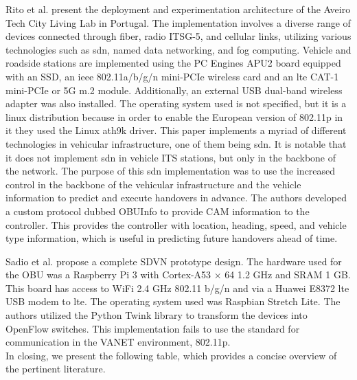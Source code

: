     
    Rito et al.\cite{rito_aveiro_2023} present the deployment and experimentation architecture of the Aveiro Tech City Living Lab in Portugal. The implementation involves a diverse range of devices connected through fiber, radio ITSG-5, and cellular links, utilizing various technologies such as \gls{sdn}, named data networking, and fog computing.
    Vehicle and roadside stations are implemented using the PC Engines APU2 board equipped with an SSD, an \gls{ieee} 802.11a/b/g/n mini-PCIe wireless card and an \gls{lte} CAT-1 mini-PCIe or 5G m.2 module. Additionally, an external USB dual-band wireless adapter was also installed. The operating system used is not specified, but it is a linux distribution because in order to enable the European version of 802.11p in it they used the Linux ath9k driver.
    This paper implements a myriad of different technologies in vehicular infrastructure, one of them being \gls{sdn}. It is notable that it does not implement \gls{sdn} in vehicle ITS stations, but only in the backbone of the network. The purpose of this \gls{sdn} implementation was to use the increased control in the backbone of the vehicular infrastructure and the vehicle information to predict and execute handovers in advance. The authors developed a custom protocol dubbed OBUInfo to provide CAM information to the controller. This provides the controller with location, heading, speed, and vehicle type information, which is useful in predicting future handovers ahead of time.
    
    
    Sadio et al.\cite{sadio_design_2020} propose a complete SDVN prototype design. The hardware used for the OBU was a Raspberry Pi 3 with Cortex-A53 × 64 1.2 GHz and SRAM 1 GB. This board has access to WiFi 2.4 GHz 802.11 b/g/n and via a Huawei E8372 \gls{lte} USB modem to \gls{lte}. The operating system used was Raspbian Stretch Lite. The authors utilized the Python Twink library to transform the devices into OpenFlow switches. This implementation fails to use the standard for communication in the VANET environment, 802.11p.
    \\
    In closing, we present the following table, which provides a concise overview of the pertinent literature.

